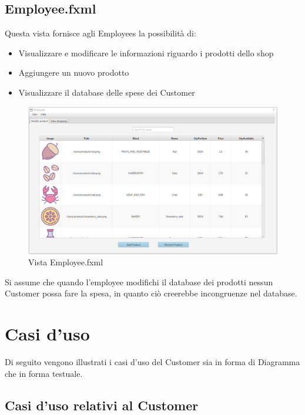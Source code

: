 \documentclass[12pt]{article}
\begin{document}
\subsection{Employee.fxml}
Questa vista fornisce agli Employees la possibilità di:

\begin{itemize}
\item Visualizzare e modificare le informazioni riguardo i prodotti dello shop
\item Aggiungere un nuovo prodotto
\item Visualizzare il database delle spese dei Customer
\end{itemize}

\begin{figure}[h!]
	\begin{center}
 	 	\includegraphics[width=\textwidth,height=\textheight,keepaspectratio]{media/views/employee.png}
  	 	 \caption{Vista Employee.fxml}
	\end{center}
\end{figure}

Si assume che quando l'employee modifichi il database dei prodotti nessun Customer possa fare la spesa, in quanto ciò creerebbe incongruenze nel database.

\section{Casi d'uso}
Di seguito vengono illustrati i casi d'uso del Customer sia in forma di Diagramma che in forma testuale.

\subsection{Casi d'uso relativi al Customer}
\end{document}
